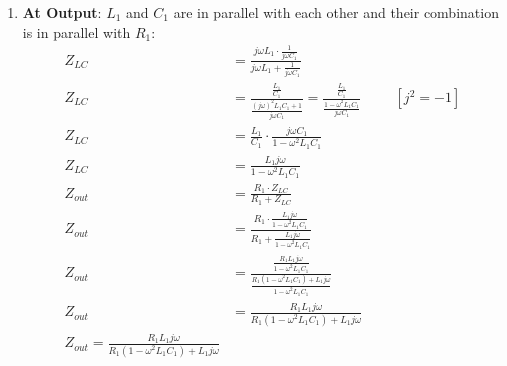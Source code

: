 \begin{enumerate}
\begin{enumerate}
\begin{enumerate}
            their combination is in series with \(R_1\):
            \begin{align*}
              Z_{LC} &= \frac{j \omega L_1 \cdot \frac{1}{j \omega C_1}}{j \omega L_1 + \frac{1}{j \omega C_1}} \\
              Z_{LC} &= \frac{\frac{L_1}{C_1}}{\frac{(j \omega)^2 L_1 C_1 + 1}{j \omega C_1}} = \frac{\frac{L_1}{C_1}}{\frac{1 - \omega^2 L_1 C_1}{j \omega C_1}} \hspace{1cm} [j^2 = -1] \\
              Z_{LC} &= \frac{L_1}{C_1} \cdot \frac{j \omega C_1}{1 - \omega^2 L_1 C_1} \\
              Z_{LC} &= \frac{L_1 j \omega}{1 - \omega^2 L_1 C_1} \\
              Z_{in} &= R_1 + Z_{LC} \\
              Z_{in} = R_1 + \frac{L_1 j \omega}{1 - \omega^2 L_1 C_1}
            \end{align*}
          \item \textbf{At Output}:
            \(L_1\) and \(C_1\) are in parallel with each other and
            their combination is in parallel with \(R_1\):
            \begin{align*}
              Z_{LC} &= \frac{j \omega L_1 \cdot \frac{1}{j \omega C_1}}{j \omega L_1 + \frac{1}{j \omega C_1}} \\
              Z_{LC} &= \frac{\frac{L_1}{C_1}}{\frac{(j \omega)^2 L_1 C_1 + 1}{j \omega C_1}} = \frac{\frac{L_1}{C_1}}{\frac{1 - \omega^2 L_1 C_1}{j \omega C_1}} \hspace{1cm} [j^2 = -1] \\
              Z_{LC} &= \frac{L_1}{C_1} \cdot \frac{j \omega C_1}{1 - \omega^2 L_1 C_1} \\
              Z_{LC} &= \frac{L_1 j \omega}{1 - \omega^2 L_1 C_1} \\
              Z_{out} &= \frac{R_1 \cdot Z_{LC}}{R_1 + Z_{LC}} \\
              Z_{out} &= \frac{R_1 \cdot \frac{L_1 j \omega}{1 - \omega^2 L_1 C_1}}{R_1 + \frac{L_1 j \omega}{1 - \omega^2 L_1 C_1}} \\
              Z_{out} &= \frac{\frac{R_1 L_1 j \omega}{1 - \omega^2 L_1 C_1}}{\frac{R_1(1 - \omega^2 L_1 C_1) + L_1 j \omega}{1 - \omega^2 L_1 C_1}} \\
              Z_{out} &= \frac{R_1 L_1 j \omega}{R_1(1 - \omega^2 L_1 C_1) + L_1 j \omega} \\
              Z_{out} = \frac{R_1 L_1 j \omega}{R_1(1 - \omega^2 L_1 C_1) + L_1 j \omega}

\end{align*}
\end{enumerate}
\end{enumerate}
\end{enumerate}
